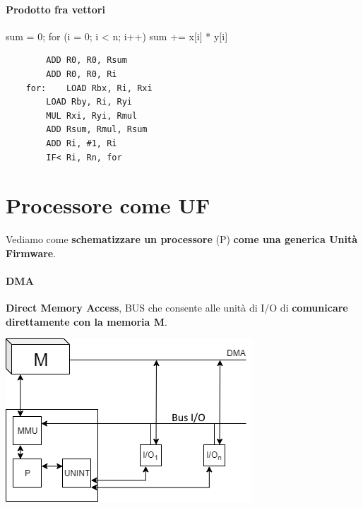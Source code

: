 \documentclass[10pt]{report}
\begin{document}
\paragraph{Prodotto fra vettori}
\begin{multicols}{2}
\begin{center}
	\begin{C}
	sum = 0;
	for (i = 0; i < n; i++) {
		sum += x[i] * y[i]
	}
	\end{C}
\end{center}
\columnbreak
\begin{center}
	\begin{lstlisting}
		ADD R0, R0, Rsum
		ADD R0, R0, Ri
	for:	LOAD Rbx, Ri, Rxi
		LOAD Rby, Ri, Ryi
		MUL Rxi, Ryi, Rmul
		ADD Rsum, Rmul, Rsum
		ADD Ri, #1, Ri
		IF< Ri, Rn, for
	\end{lstlisting}
\end{center}
\end{multicols}
\pagebreak
\section{Processore come UF}
Vediamo come \textbf{schematizzare un processore} (P) \textbf{come una generica Unità Firmware}.
\paragraph{DMA} \textbf{Direct Memory Access}, BUS che consente alle unità di I/O di \textbf{comunicare direttamente con la memoria M}.
\begin{center}
\includegraphics[scale=1]{procuf.png}
\end{center}
\end{document}
